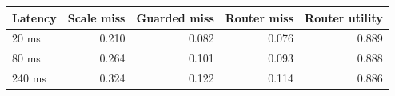 \begin{tabular}{lrrrr}
\toprule
Latency & Scale miss & Guarded miss & Router miss & Router utility \\
\midrule
20 ms & 0.210 & 0.082 & 0.076 & 0.889 \\
80 ms & 0.264 & 0.101 & 0.093 & 0.888 \\
240 ms & 0.324 & 0.122 & 0.114 & 0.886 \\
\bottomrule
\end{tabular}

